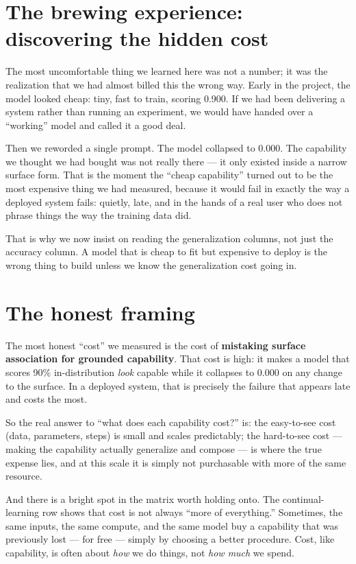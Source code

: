\section{The brewing experience: discovering the hidden
cost}\label{the-brewing-experience-discovering-the-hidden-cost}

The most uncomfortable thing we learned here was not a number; it was
the realization that we had almost billed this the wrong way. Early in
the project, the model looked cheap: tiny, fast to train, scoring 0.900.
If we had been delivering a system rather than running an experiment, we
would have handed over a ``working'' model and called it a good deal.

Then we reworded a single prompt. The model collapsed to 0.000. The
capability we thought we had bought was not really there --- it only
existed inside a narrow surface form. That is the moment the ``cheap
capability'' turned out to be the most expensive thing we had measured,
because it would fail in exactly the way a deployed system fails:
quietly, late, and in the hands of a real user who does not phrase
things the way the training data did.

That is why we now insist on reading the generalization columns, not
just the accuracy column. A model that is cheap to fit but expensive to
deploy is the wrong thing to build unless we know the generalization
cost going in.

\section{The honest framing}\label{the-honest-framing}

The most honest ``cost'' we measured is the cost of \textbf{mistaking
surface association for grounded capability}. That cost is high: it
makes a model that scores 90\% in-distribution \emph{look} capable while
it collapses to 0.000 on any change to the surface. In a deployed
system, that is precisely the failure that appears late and costs the
most.

So the real answer to ``what does each capability cost?'' is: the
easy-to-see cost (data, parameters, steps) is small and scales
predictably; the hard-to-see cost --- making the capability actually
generalize and compose --- is where the true expense lies, and at this
scale it is simply not purchasable with more of the same resource.

And there is a bright spot in the matrix worth holding onto. The
continual-learning row shows that cost is not always ``more of
everything.'' Sometimes, the same inputs, the same compute, and the same
model buy a capability that was previously lost --- for free --- simply
by choosing a better procedure. Cost, like capability, is often about
\emph{how} we do things, not \emph{how much} we spend.
